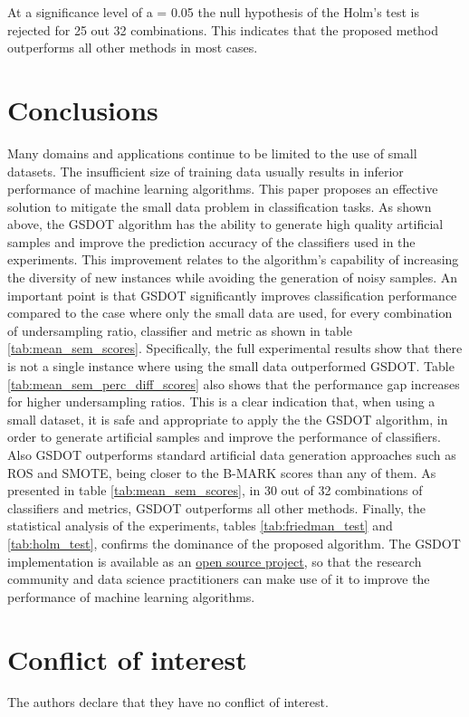 \documentclass[10pt,letterpaper]{article}
\begin{document}
At a significance level of a = 0.05 the null hypothesis of the Holm's test is
rejected for 25 out 32 combinations. This indicates that the proposed method
outperforms all other methods in most cases.

\section{Conclusions}
\label{conclusions}

Many domains and applications continue to be limited to the use of small datasets. The insufficient size of training data usually results in inferior performance of machine learning algorithms. This paper proposes an effective solution to mitigate the small data problem in classification tasks. As shown above, the GSDOT algorithm has the ability to generate high quality artificial samples and improve the prediction accuracy of the classifiers used in the experiments. This improvement relates to the algorithm's capability of increasing the diversity of new instances while avoiding the generation of noisy samples. An important point is that GSDOT significantly improves classification performance compared to the case where only the small data are used, for every combination of undersampling ratio, classifier and metric as shown in table \ref{tab:mean_sem_scores}. Specifically, the full experimental results show that there is not a single instance where using the small data outperformed GSDOT. Table \ref{tab:mean_sem_perc_diff_scores} also shows that the performance gap increases for higher undersampling ratios. This is a clear indication that, when using a small dataset, it is safe and appropriate to apply the the GSDOT algorithm, in order to generate artificial samples and improve the performance of classifiers. Also GSDOT outperforms standard artificial data generation approaches such as ROS and SMOTE, being closer to the B-MARK scores than any of them. As presented in table \ref{tab:mean_sem_scores}, in 30 out of 32 combinations of classifiers and metrics, GSDOT outperforms all other methods. Finally, the statistical analysis of the experiments, tables \ref{tab:friedman_test} and \ref{tab:holm_test}, confirms the dominance of the proposed algorithm. The GSDOT implementation is available as an \href{https://geometric-smote.readthedocs.io/en/latest/?badge=latest}{open source project}, so that the research community and data science practitioners can make use of it to improve the performance of machine learning algorithms.

\section*{Conflict of interest}
The authors declare that they have no conflict of interest.
\end{document}

